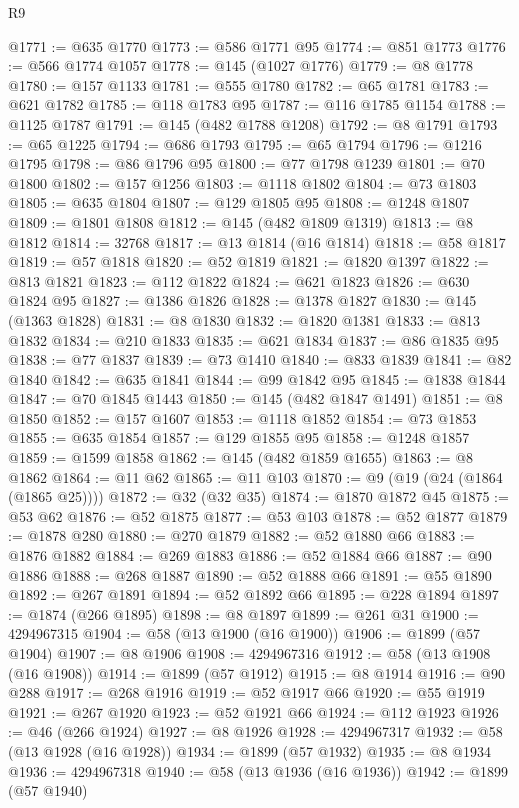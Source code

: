\begin{lexlean}{R9}
\begin{coremodule}
@1771 := @635 @1770
@1773 := @586 @1771 @95
@1774 := @851 @1773
@1776 := @566 @1774 @1057
@1778 := @145 (@1027 @1776)
@1779 := @8 @1778
@1780 := @157 @1133
@1781 := @555 @1780
@1782 := @65 @1781
@1783 := @621 @1782
@1785 := @118 @1783 @95
@1787 := @116 @1785 @1154
@1788 := @1125 @1787
@1791 := @145 (@482 @1788 @1208)
@1792 := @8 @1791
@1793 := @65 @1225
@1794 := @686 @1793
@1795 := @65 @1794
@1796 := @1216 @1795
@1798 := @86 @1796 @95
@1800 := @77 @1798 @1239
@1801 := @70 @1800
@1802 := @157 @1256
@1803 := @1118 @1802
@1804 := @73 @1803
@1805 := @635 @1804
@1807 := @129 @1805 @95
@1808 := @1248 @1807
@1809 := @1801 @1808
@1812 := @145 (@482 @1809 @1319)
@1813 := @8 @1812
@1814 := 32768
@1817 := @13 @1814 (@16 @1814)
@1818 := @58 @1817
@1819 := @57 @1818
@1820 := @52 @1819
@1821 := @1820 @1397
@1822 := @813 @1821
@1823 := @112 @1822
@1824 := @621 @1823
@1826 := @630 @1824 @95
@1827 := @1386 @1826
@1828 := @1378 @1827
@1830 := @145 (@1363 @1828)
@1831 := @8 @1830
@1832 := @1820 @1381
@1833 := @813 @1832
@1834 := @210 @1833
@1835 := @621 @1834
@1837 := @86 @1835 @95
@1838 := @77 @1837
@1839 := @73 @1410
@1840 := @833 @1839
@1841 := @82 @1840
@1842 := @635 @1841
@1844 := @99 @1842 @95
@1845 := @1838 @1844
@1847 := @70 @1845 @1443
@1850 := @145 (@482 @1847 @1491)
@1851 := @8 @1850
@1852 := @157 @1607
@1853 := @1118 @1852
@1854 := @73 @1853
@1855 := @635 @1854
@1857 := @129 @1855 @95
@1858 := @1248 @1857
@1859 := @1599 @1858
@1862 := @145 (@482 @1859 @1655)
@1863 := @8 @1862
@1864 := @11 @62
@1865 := @11 @103
@1870 := @9 (@19 (@24 (@1864 (@1865 @25))))
@1872 := @32 (@32 @35)
@1874 := @1870 @1872 @45
@1875 := @53 @62
@1876 := @52 @1875
@1877 := @53 @103
@1878 := @52 @1877
@1879 := @1878 @280
@1880 := @270 @1879
@1882 := @52 @1880 @66
@1883 := @1876 @1882
@1884 := @269 @1883
@1886 := @52 @1884 @66
@1887 := @90 @1886
@1888 := @268 @1887
@1890 := @52 @1888 @66
@1891 := @55 @1890
@1892 := @267 @1891
@1894 := @52 @1892 @66
@1895 := @228 @1894
@1897 := @1874 (@266 @1895)
@1898 := @8 @1897
@1899 := @261 @31
@1900 := 4294967315
@1904 := @58 (@13 @1900 (@16 @1900))
@1906 := @1899 (@57 @1904)
@1907 := @8 @1906
@1908 := 4294967316
@1912 := @58 (@13 @1908 (@16 @1908))
@1914 := @1899 (@57 @1912)
@1915 := @8 @1914
@1916 := @90 @288
@1917 := @268 @1916
@1919 := @52 @1917 @66
@1920 := @55 @1919
@1921 := @267 @1920
@1923 := @52 @1921 @66
@1924 := @112 @1923
@1926 := @46 (@266 @1924)
@1927 := @8 @1926
@1928 := 4294967317
@1932 := @58 (@13 @1928 (@16 @1928))
@1934 := @1899 (@57 @1932)
@1935 := @8 @1934
@1936 := 4294967318
@1940 := @58 (@13 @1936 (@16 @1936))
@1942 := @1899 (@57 @1940)

\end{coremodule}
\end{lexlean}
